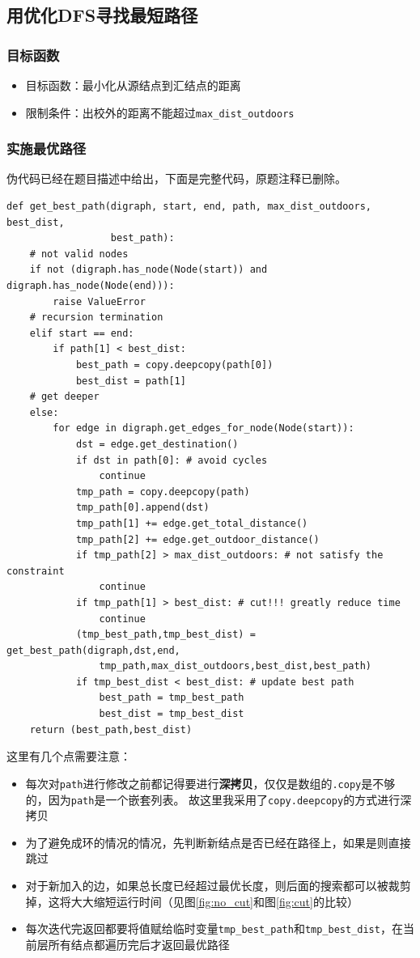 \documentclass[logo,reportComp]{thesis}
\begin{document}
\subsection{用优化DFS寻找最短路径}
\subsubsection{目标函数}
\begin{itemize}
\item 目标函数：最小化从源结点到汇结点的距离
\item 限制条件：出校外的距离不能超过\verb'max_dist_outdoors'
\end{itemize}

\subsubsection{实施最优路径}
伪代码已经在题目描述中给出，下面是完整代码，原题注释已删除。
\begin{lstlisting}
def get_best_path(digraph, start, end, path, max_dist_outdoors, best_dist,
                  best_path):
    # not valid nodes
    if not (digraph.has_node(Node(start)) and digraph.has_node(Node(end))):
        raise ValueError
    # recursion termination
    elif start == end:
        if path[1] < best_dist:
            best_path = copy.deepcopy(path[0])
            best_dist = path[1]
    # get deeper
    else:
        for edge in digraph.get_edges_for_node(Node(start)):
            dst = edge.get_destination()
            if dst in path[0]: # avoid cycles
                continue
            tmp_path = copy.deepcopy(path)
            tmp_path[0].append(dst)
            tmp_path[1] += edge.get_total_distance()
            tmp_path[2] += edge.get_outdoor_distance()
            if tmp_path[2] > max_dist_outdoors: # not satisfy the constraint
                continue
            if tmp_path[1] > best_dist: # cut!!! greatly reduce time
                continue
            (tmp_best_path,tmp_best_dist) = get_best_path(digraph,dst,end,
                tmp_path,max_dist_outdoors,best_dist,best_path)
            if tmp_best_dist < best_dist: # update best path
                best_path = tmp_best_path
                best_dist = tmp_best_dist
    return (best_path,best_dist)
\end{lstlisting}

这里有几个点需要注意：
\begin{itemize}
    \item 每次对\verb'path'进行修改之前都记得要进行\textbf{深拷贝}，仅仅是数组的\verb'.copy'是不够的，因为\verb'path'是一个嵌套列表。
    故这里我采用了\verb'copy.deepcopy'的方式进行深拷贝
    \item 为了避免成环的情况的情况，先判断新结点是否已经在路径上，如果是则直接跳过
    \item 对于新加入的边，如果总长度已经超过最优长度，则后面的搜索都可以被裁剪掉，这将大大缩短运行时间（见图\ref{fig:no_cut}和图\ref{fig:cut}的比较）
    \item 每次迭代完返回都要将值赋给临时变量\verb'tmp_best_path'和\verb'tmp_best_dist'，在当前层所有结点都遍历完后才返回最优路径
\end{itemize}
\end{document}
